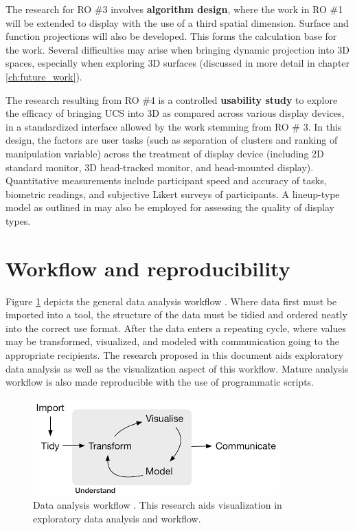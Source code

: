 \documentclass{monashthesis}
\begin{document}
The research for RO \#3 involves \textbf{algorithm design}, where the
work in RO \#1 will be extended to display with the use of a third
spatial dimension. Surface and function projections will also be
developed. This forms the calculation base for the work. Several
difficulties may arise when bringing dynamic projection into 3D spaces,
especially when exploring 3D surfaces (discussed in more detail in
chapter \ref{ch:future_work}).

The research resulting from RO \#4 is a controlled \textbf{usability
study} to explore the efficacy of bringing UCS into 3D as compared
across various display devices, in a standardized interface allowed by
the work stemming from RO \# 3. In this design, the factors are user
tasks (such as separation of clusters and ranking of manipulation
variable) across the treatment of display device (including 2D standard
monitor, 3D head-tracked monitor, and head-mounted display).
Quantitative measurements include participant speed and accuracy of
tasks, biometric readings, and subjective Likert surveys of
participants. A lineup-type model as outlined in
\textcite{hofmann_graphical_2012} may also be employed for assessing the
quality of display types.

\section{Workflow and
reproducibility}\label{workflow-and-reproducibility}

Figure \ref{fig:dataanalysisworkflow} depicts the general data analysis
workflow \autocite{wickham_r_2016}. Where data first must be imported
into a tool, the structure of the data must be tidied and ordered neatly
into the correct use format. After the data enters a repeating cycle,
where values may be transformed, visualized, and modeled with
communication going to the appropriate recipients. The research proposed
in this document aids exploratory data analysis as well as the
visualization aspect of this workflow. Mature analysis workflow is also
made reproducible with the use of programmatic scripts.





\begin{figure}

{\centering \includegraphics[width=1\linewidth]{./figures/data_analysis_workflow} 

}

\caption{Data analysis workflow
\autocite{wickham_r_2016}. This research aids visualization in
exploratory data analysis and workflow.}\label{fig:dataanalysisworkflow}
\end{figure}
\end{document}
